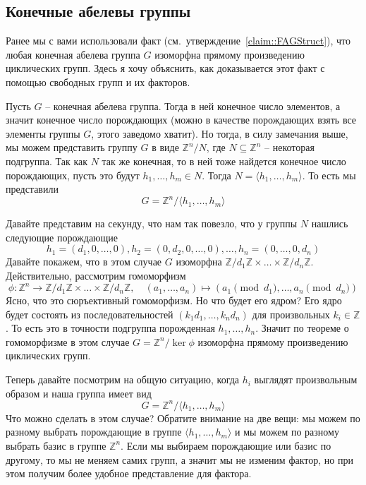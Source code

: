 \subsection{Конечные абелевы группы}

Ранее мы с вами использовали факт (см.~утверждение~\ref{claim::FAGStruct}), что любая конечная абелева группа $G$ изоморфна прямому произведению циклических групп.
Здесь я хочу объяснить, как доказывается этот факт с помощью свободных групп и их факторов.

Пусть $G$ -- конечная абелева группа.
Тогда в ней конечное число элементов, а значит конечное число порождающих (можно в качестве порождающих взять все элементы группы $G$, этого заведомо хватит).
Но тогда, в силу замечания выше, мы можем представить группу $G$ в виде $\mathbb Z^n / N$, где $N\subseteq \mathbb Z^n$ -- некоторая подгруппа.
Так как $N$ так же конечная, то в ней тоже найдется конечное число порождающих, пусть это будут $h_1,\ldots,h_m\in N$.
Тогда $N = \langle h_1,\ldots, h_m\rangle$.
То есть мы представили 
\[
G = \mathbb Z^n / \langle h_1,\ldots, h_m \rangle
\]

Давайте представим на секунду, что нам так повезло, что у группы $N$ нашлись следующие порождающие
\[
h_1 = (d_1,0,\ldots, 0), h_2 = (0, d_2,0,\ldots, 0),\ldots, h_n = (0,\ldots,0,d_n)
\]
Давайте покажем, что в этом случае $G$ изоморфна $\mathbb Z/d_1 \mathbb Z \times \ldots \times \mathbb Z/d_n \mathbb Z$.
Действительно, рассмотрим гомоморфизм 
\[
\phi \colon \mathbb Z^n \to \mathbb Z/d_1 \mathbb Z \times \ldots \times \mathbb Z/d_n \mathbb Z,\quad (a_1,\ldots,a_n) \mapsto (a_1 \pmod{d_1},\ldots, a_n \pmod{d_n})
\]
Ясно, что это сюръективный гомоморфизм.
Но что будет его ядром?
Его ядро будет состоять из последовательностей $(k_1 d_1, \ldots, k_n d_n)$ для произвольных $k_i \in \mathbb Z$.
То есть это в точности подгруппа порожденная $h_1,\ldots,h_n$.
Значит по теореме о гомоморфизме в этом случае $G = \mathbb Z^n / \ker \phi$ изоморфна прямому произведению циклических групп.

Теперь давайте посмотрим на общую ситуацию, когда $h_i$ выглядят произвольным образом и наша группа имеет вид
\[
G = \mathbb Z^n / \langle h_1,\ldots, h_m \rangle
\]
Что можно сделать в этом случае?
Обратите внимание на две вещи: мы можем по разному выбрать порождающие в группе $\langle h_1,\ldots, h_m\rangle$ и мы можем по разному выбрать базис в группе $\mathbb Z^n$.
Если мы выбираем порождающие или базис по другому, то мы не меняем самих групп, а значит мы не изменим фактор, но при этом получим более удобное представление для фактора.

